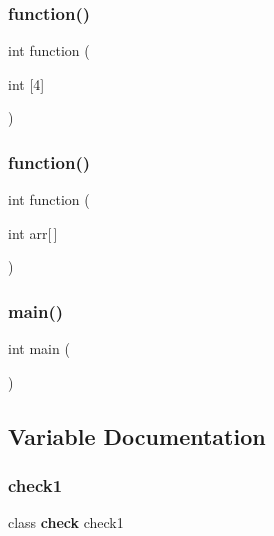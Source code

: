 \mbox{\label{check_8cpp_a527432c71d7bedc5261d8b3834fc5266}} 
\subsubsection{function()\hspace{0.1cm}{\footnotesize\ttfamily [1/2]}}
{\footnotesize\ttfamily int function (\begin{DoxyParamCaption}\item[{int}]{[4] }\end{DoxyParamCaption})}

\mbox{\label{check_8cpp_aa3c75eb137ff09226af29ac28246c2fa}} 
\subsubsection{function()\hspace{0.1cm}{\footnotesize\ttfamily [2/2]}}
{\footnotesize\ttfamily int function (\begin{DoxyParamCaption}\item[{int}]{arr[$\,$] }\end{DoxyParamCaption})}

\mbox{\label{check_8cpp_ae66f6b31b5ad750f1fe042a706a4e3d4}} 
\subsubsection{main()}
{\footnotesize\ttfamily int main (\begin{DoxyParamCaption}{ }\end{DoxyParamCaption})}



\subsection{Variable Documentation}
\mbox{\label{check_8cpp_a0eac68a12bc6181ee5265149c4db0a02}} 
\subsubsection{check1}
{\footnotesize\ttfamily class \textbf{ check}  check1}


